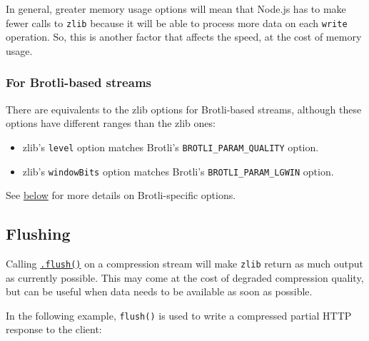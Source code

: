 In general, greater memory usage options will mean that Node.js has to
make fewer calls to \texttt{zlib} because it will be able to process
more data on each \texttt{write} operation. So, this is another factor
that affects the speed, at the cost of memory usage.

\subsubsection{For Brotli-based streams}\label{for-brotli-based-streams}

There are equivalents to the zlib options for Brotli-based streams,
although these options have different ranges than the zlib ones:

\begin{itemize}
\tightlist
\item
  zlib's \texttt{level} option matches Brotli's
  \texttt{BROTLI\_PARAM\_QUALITY} option.
\item
  zlib's \texttt{windowBits} option matches Brotli's
  \texttt{BROTLI\_PARAM\_LGWIN} option.
\end{itemize}

See \hyperref[brotli-constants]{below} for more details on
Brotli-specific options.

\subsection{Flushing}\label{flushing}

Calling \hyperref[zlibflushkind-callback]{\texttt{.flush()}} on a
compression stream will make \texttt{zlib} return as much output as
currently possible. This may come at the cost of degraded compression
quality, but can be useful when data needs to be available as soon as
possible.

In the following example, \texttt{flush()} is used to write a compressed
partial HTTP response to the client:

